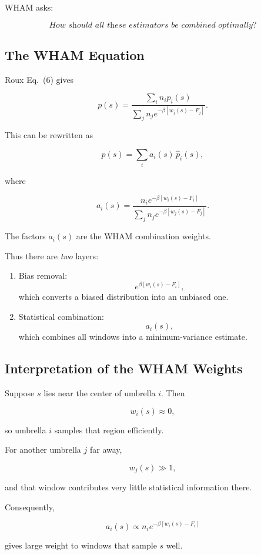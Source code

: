 WHAM asks:

\[
\textit{How should all these estimators be combined optimally?}
\]

\subsection{The WHAM Equation}

Roux Eq.~(6) gives

\[
p(s)
=
\frac{
\displaystyle
\sum_i n_i p_i(s)
}{
\displaystyle
\sum_j n_j e^{-\beta[w_j(s)-F_j]}
}.
\]

This can be rewritten as

\[
p(s)
=
\sum_i a_i(s)\,\hat p_i(s),
\]

where

\[
a_i(s)
=
\frac{
n_i e^{-\beta[w_i(s)-F_i]}
}{
\displaystyle
\sum_j n_j e^{-\beta[w_j(s)-F_j]}
}.
\]

The factors \(a_i(s)\) are the WHAM combination weights.

Thus there are \emph{two} layers:

\begin{enumerate}
    \item Bias removal:
    \[
    e^{\beta[w_i(s)-F_i]},
    \]
    which converts a biased distribution into an unbiased one.

    \item Statistical combination:
    \[
    a_i(s),
    \]
    which combines all windows into a minimum-variance estimate.
\end{enumerate}

\subsection{Interpretation of the WHAM Weights}

Suppose \(s\) lies near the center of umbrella \(i\). Then

\[
w_i(s)\approx 0,
\]

so umbrella \(i\) samples that region efficiently.

For another umbrella \(j\) far away,

\[
w_j(s)\gg 1,
\]

and that window contributes very little statistical information there.

Consequently,

\[
a_i(s)
\propto
n_i e^{-\beta[w_i(s)-F_i]}
\]

gives large weight to windows that sample \(s\) well.


